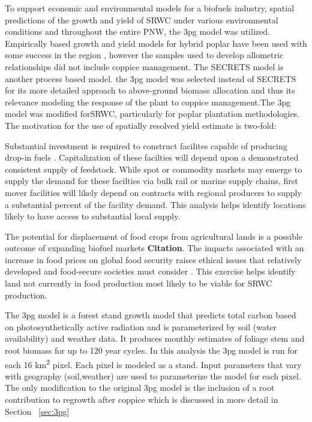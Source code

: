 \documentclass[preprint,12pt]{elsarticle}
\begin{document}
To support economic and environmental models for a biofuels industry,
spatial predictions of the growth and yield of \acf{SRWC} under
various environmental conditions and throughout the entire \acf{PNW},
the \acf{3pg}\cite{landsberg2010physiological,Landsberg1997,Sands2004}
model was utilized.  Empirically based growth and yield models for
hybrid poplar have been used with some success in the region
\cite{Clendenen1996}, however the samples used to develop allometric
relationships did not include coppice management.  The \ac{SECRETS}
model \cite{Sampson2001} is another process based model. the \ac{3pg}
model was selected instead of \ac{SECRETS} for its more detailed
approach to above-ground biomass allocation and thus its relevance
modeling the response of the plant to coppice management.The \ac{3pg} model was modified for\ac{SRWC}, particularly for poplar plantation methodologies. The
motivation for the use of spatially resolved yield estimate is two-fold:
\begin{description}
\item[Biofuels production system optimization] Substantial investment
  is required to construct facilites capable of producing drop-in
  fuels \cite{Parker2010a}. Capitalization of these facilties will
  depend upon a demonstrated
  consistent supply of feedstock. While spot or commodity markets may
  emerge to supply the demand for these facilties via bulk rail or
  marine supply chains, first mover facilities will
  likely depend on contracts with regional producers to supply a
  substantial percent of the facility demand. This analysis helps
  identify locations likely to have access to substantial local
  supply.
\item[Land use] The potential for displacement of food crops from
  agricultural lands is a possible outcome of expanding biofuel
  markets \textbf{Citation}. The impacts associated with an increase in food
  prices on global food security raises ethical issues that relatively
  developed and food-secure societies must consider
  \cite{Pimentel2008}. This exercise helps identify land not currently
  in food production most likely to be viable for \ac{SRWC} production.
\item
\end{description}

The \ac{3pg} model \cite{Landsberg1997} is a forest stand growth model that predicts total carbon
based on photosynthetically active radiation and is parameterized by
soil (water availability) and weather data. It produces monthly
estimates of foliage stem and root biomass for up to 120 year
cycles. In this analysis the \ac{3pg} model is run for each 16
km\textsuperscript{2} pixel. Each pixel is modeled as a stand. Input
parameters that vary with geography (soil,weather) are used to
parameterize the model for each pixel. The only modification to the
original \ac{3pg} model is the inclusion of a root contribution to
regrowth after coppice which is discussed in more detail in Section ~\ref{sec:3pg}
\end{document}
